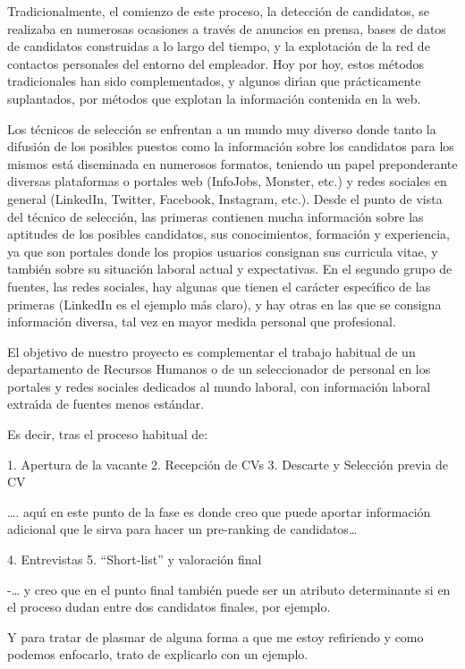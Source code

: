 \documentclass[11pt,a4paper,leqno,titlepage,twoside]{book}
\begin{document}
Tradicionalmente, el comienzo de este proceso, la detecci\'on de candidatos, se realizaba en numerosas ocasiones 
a trav\'es de anuncios en prensa,
bases de datos de candidatos construidas a lo largo del tiempo, y la explotaci\'on de la red de contactos personales del entorno 
del empleador. Hoy por hoy, estos m\'etodos tradicionales han sido complementados, y algunos dir\'\i an que pr\'acticamente
suplantados, por m\'etodos que explotan la informaci\'on contenida en la web. 

Los t\'ecnicos de selecci\'on se enfrentan a un mundo muy diverso donde tanto la difusi\'on de los 
posibles puestos como la informaci\'on sobre los candidatos para los mismos est\'a diseminada en numerosos
formatos, teniendo un papel preponderante diversas plataformas o portales web (InfoJobs, Monster, etc.)
y redes sociales en general (LinkedIn, Twitter, Facebook, Instagram, etc.). Desde el punto de vista del t\'ecnico de selecci\'on, las
primeras contienen mucha informaci\'on sobre las aptitudes de los posibles candidatos, sus conocimientos, formaci\'on y 
experiencia, ya que son portales donde los propios usuarios consignan sus curricula vitae, y tambi\'en sobre su situaci\'on laboral
actual y expectativas. En el segundo grupo de fuentes, las redes sociales, hay algunas que tienen el car\'acter espec\'\i fico 
de las primeras (LinkedIn es el ejemplo m\'as claro), y hay otras en las que se consigna informaci\'on diversa, tal vez en 
mayor medida personal que profesional.

El objetivo de nuestro proyecto es complementar el 
trabajo habitual de un departamento de Recursos Humanos o de un seleccionador de personal en
los portales y redes sociales dedicados al mundo laboral, con informaci\'on laboral extra\'\i da 
de fuentes menos est\'andar. 

Es decir, tras el proceso habitual de:

1. Apertura de la vacante
2. Recepci\'on de CVs
3. Descarte y Selecci\'on previa de CV

…. aqu\'{\i} en este punto de la fase es donde creo que puede aportar informaci\'on adicional que le sirva para hacer un 
pre-ranking de candidatos…

4. Entrevistas
5. “Short-list” y valoraci\'on final

-… y creo que en el punto final tambi\'en puede ser un atributo determinante si en el proceso dudan entre dos candidatos 
finales, por ejemplo.

Y para tratar de plasmar de alguna forma a que me estoy refiriendo y como podemos enfocarlo, trato de explicarlo con un ejemplo.
\end{document}
